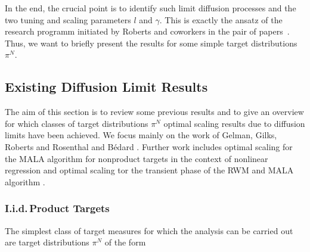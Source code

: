 In the end, the crucial point is to identify such limit diffusion processes and the two tuning and scaling parameters $l$ and $\gamma$. This is exactly the ansatz of the research programm initiated by Roberts and coworkers in the pair of papers~\autocite{Roberts1997, Roberts2001}. Thus, we want to  briefly present the results for some simple target distributions $ \pi^{N} $.


\subsection{Existing Diffusion Limit Results}
\label{CC:Existing results}

The aim of this section is to review some previous results and to give an overview for which classes of target distributions $\pi^{N}$ optimal scaling results due to diffusion limits have been achieved. We focus mainly on the work of  Gelman, Gilks, Roberts and Rosenthal and B\'{e}dard \autocite{Bedard2007, Roberts1997, Roberts2001, Roberts1998}. Further work includes optimal scaling for the MALA algorithm for nonproduct targets in the context of nonlinear regression \autocite{breyer2004} and optimal scaling tor the transient phase of the RWM and MALA algorithm \autocite{Christensen2003, Jourdain2013}.

\subsubsection{I.i.d.\,Product Targets} 

The simplest class of target measures for which the analysis can be carried out are target distributions $ \pi^{N} $ of the form

